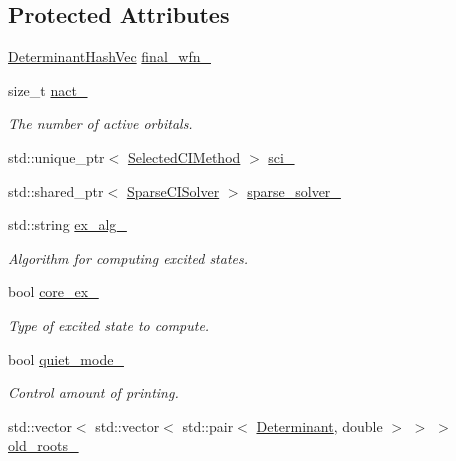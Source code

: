 \subsection*{Protected Attributes}
\begin{DoxyCompactItemize}
\item 
\mbox{\hyperlink{classforte_1_1_determinant_hash_vec}{Determinant\+Hash\+Vec}} \mbox{\hyperlink{classforte_1_1_excited_state_solver_af298efddc513251183107bb72d744443}{final\+\_\+wfn\+\_\+}}
\item 
size\+\_\+t \mbox{\hyperlink{classforte_1_1_excited_state_solver_a505b5254f0c2f79ea4e68399e920f86c}{nact\+\_\+}}
\begin{DoxyCompactList}\small\item\em The number of active orbitals. \end{DoxyCompactList}\item 
std\+::unique\+\_\+ptr$<$ \mbox{\hyperlink{classforte_1_1_selected_c_i_method}{Selected\+C\+I\+Method}} $>$ \mbox{\hyperlink{classforte_1_1_excited_state_solver_a0e955b7e55dbe66bb00cde9c7a1f471a}{sci\+\_\+}}
\item 
std\+::shared\+\_\+ptr$<$ \mbox{\hyperlink{classforte_1_1_sparse_c_i_solver}{Sparse\+C\+I\+Solver}} $>$ \mbox{\hyperlink{classforte_1_1_excited_state_solver_aa95a33586d406350f679c8ecd0558bc6}{sparse\+\_\+solver\+\_\+}}
\item 
std\+::string \mbox{\hyperlink{classforte_1_1_excited_state_solver_af06c1d8815fb1689fe1b61eadc989b4a}{ex\+\_\+alg\+\_\+}}
\begin{DoxyCompactList}\small\item\em Algorithm for computing excited states. \end{DoxyCompactList}\item 
bool \mbox{\hyperlink{classforte_1_1_excited_state_solver_acbbb9da97416aeb1810c9cb0a4d6926d}{core\+\_\+ex\+\_\+}}
\begin{DoxyCompactList}\small\item\em Type of excited state to compute. \end{DoxyCompactList}\item 
bool \mbox{\hyperlink{classforte_1_1_excited_state_solver_ad3075448f2724d563f6f9d49b44d4f69}{quiet\+\_\+mode\+\_\+}}
\begin{DoxyCompactList}\small\item\em Control amount of printing. \end{DoxyCompactList}\item 
std\+::vector$<$ std\+::vector$<$ std\+::pair$<$ \mbox{\hyperlink{namespaceforte_a2076c63fd7b8732004d9e1442ce527c1}{Determinant}}, double $>$ $>$ $>$ \mbox{\hyperlink{classforte_1_1_excited_state_solver_aed69b2410026b59edb0d7fcb0b2eb3c2}{old\+\_\+roots\+\_\+}}

\end{DoxyCompactItemize}
